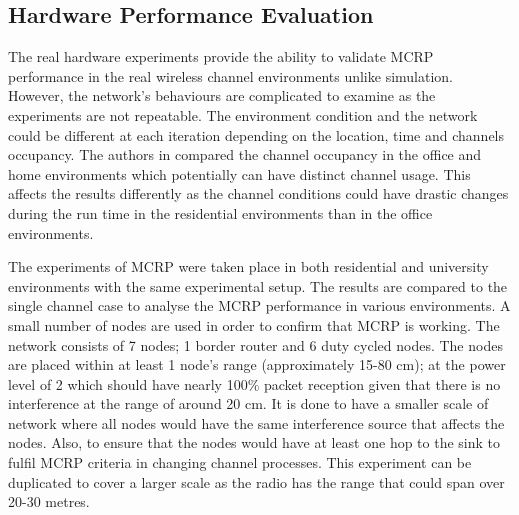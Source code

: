 \subsection{Hardware Performance Evaluation}


The real hardware experiments provide the ability to validate MCRP performance in the real wireless channel environments unlike simulation. However, the network's behaviours are complicated to examine as the experiments are not repeatable. The environment condition and the network could be different at each iteration depending on the location, time and channels occupancy. The authors in \cite{homearea} compared the channel occupancy in the office and home environments which potentially can have distinct channel usage. This affects the results differently as the channel conditions could have drastic changes during the run time in the residential environments than in the office environments.

The experiments of MCRP were taken place in both residential and university environments with the same experimental setup.
The results are compared to the single channel case to analyse the MCRP performance in various environments.
A small number of nodes are used in order to confirm that MCRP is working. The network consists of 7 nodes; 1 border router and 6 duty cycled nodes. The nodes are placed within at least 1 node's range (approximately 15-80 cm); at the power level of 2 which should have nearly 100\% packet reception given that there is no interference at the range of around 20 cm. 
It is done to have a smaller scale of network where all nodes would have the same interference source that affects the nodes. Also, to ensure that the nodes would have at least one hop to the sink to fulfil MCRP criteria in changing channel processes. This experiment can be duplicated to cover a larger scale as the radio has the range that could span over 20-30 metres. 


